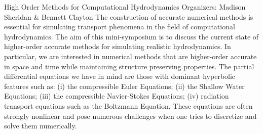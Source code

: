 \label{mini25}


\miniabs
{High Order Methods for Computational Hydrodynamics}
{Organizers: Madison Sheridan \& Bennett Clayton}
{The construction of accurate numerical methods is essential for simulating transport phenomena in the field of computational hydrodynamics. The aim of this mini-symposium is to discuss the current state of higher-order accurate methods for simulating realistic hydrodynamics. In particular, we are interested in numerical methods that are higher-order accurate in space and time while maintaining structure preserving properties. The partial differential equations we have in mind are those with dominant hyperbolic features such as: (i) the compressible Euler Equations; (ii) the Shallow Water Equations; (iii) the compressible Navier-Stokes Equations; (iv) radiation transport equations such as the Boltzmann Equation. These equations are often strongly nonlinear and pose numerous challenges when one tries to discretize and solve them numerically.}

